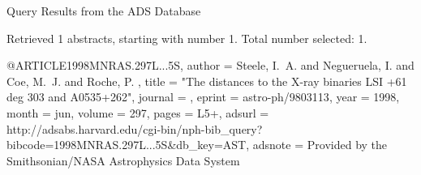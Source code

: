 Query Results from the ADS Database


Retrieved 1 abstracts, starting with number 1.  Total number selected: 1.

@ARTICLE{1998MNRAS.297L...5S,
   author = {{Steele}, I.~A. and {Negueruela}, I. and {Coe}, M.~J. and {Roche}, P.
	},
    title = "{The distances to the X-ray binaries LSI +61 deg 303 and A0535+262}",
  journal = {\mnras},
   eprint = {astro-ph/9803113},
     year = 1998,
    month = jun,
   volume = 297,
    pages = {L5+},
   adsurl = {http://adsabs.harvard.edu/cgi-bin/nph-bib_query?bibcode=1998MNRAS.297L...5S&db_key=AST},
  adsnote = {Provided by the Smithsonian/NASA Astrophysics Data System}
}


